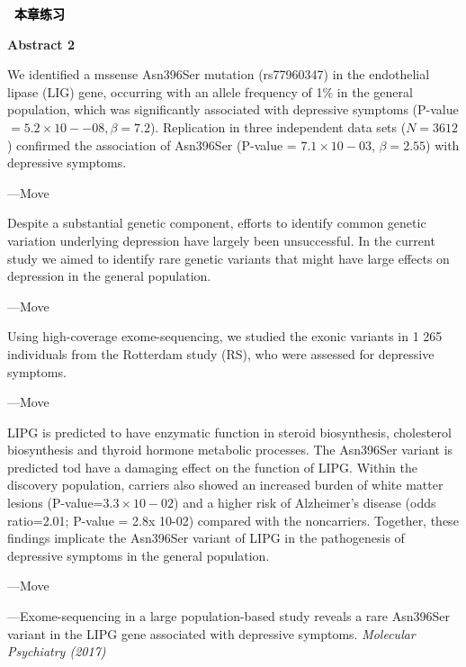 \documentclass[a4paper]{ctexbook}
\newenvironment{problemset}[1][本章练习]{
  \begin{center}
    \phantomsection\addcontentsline{toc}{section}{\texorpdfstring{本章练习}{Exercice}}
    \markright{#1}
    \textcolor{black}{\Large\bfseries\adftripleflourishleft~#1~\adftripleflourishright}
  \end{center}
  \begin{enumerate}}{
  \end{enumerate}}
\begin{document}
\begin{problemset}
  \textbf{Abstract 2}
  
  \hspace*{2em}We identified a mssense Asn396Ser mutation (rs77960347) in the endothelial lipase (LIG) gene, occurring with an allele frequency of 1\% in the general population, which was significantly associated with depressive symptoms (P-value $= 5.2 \times 10--08, \beta=7.2$). Replication in three independent data sets ($N= 3612$) confirmed the association of Asn396Ser (P-value = $7.1 \times 10-03$, $\beta = 2.55$) with depressive symptoms.

  \hspace*{2em}---Move \uline{\hspace*{3em}}

  \hspace*{2em}Despite a substantial genetic component, efforts to identify common genetic variation underlying depression have largely been unsuccessful. In the current study we aimed to identify rare genetic variants that might have large effects on depression in the general population.

  \hspace*{2em}---Move \uline{\hspace*{3em}}

  \hspace*{2em}Using high-coverage exome-sequencing, we studied the exonic variants in 1 265 individuals from the Rotterdam study (RS), who were assessed for depressive symptoms.

  \hspace*{2em}---Move \uline{\hspace*{3em}}

  \hspace*{2em}LIPG is predicted to have enzymatic function in steroid biosynthesis, cholesterol biosynthesis and thyroid hormone metabolic processes. The Asn396Ser variant is predicted tod have a damaging effect on the function of LIPG. Within the discovery population, carriers also showed an increased burden of white matter lesions (P-value=$3.3 \times 10-02$) and a higher risk of Alzheimer's disease (odds ratio=2.01; P-value = 2.8x 10-02) compared with the noncarriers. Together, these findings implicate the Asn396Ser variant of LIPG in the pathogenesis of depressive symptoms in the general population.

  \hspace*{2em}---Move \uline{\hspace*{3em}}

  \begin{flushright}
    ---Exome-sequencing in a large population-based study reveals a rare Asn396Ser variant in the LIPG gene associated with depressive symptoms. \emph{Molecular Psychiatry (2017)}
  \end{flushright}


\end{problemset}
\end{document}
